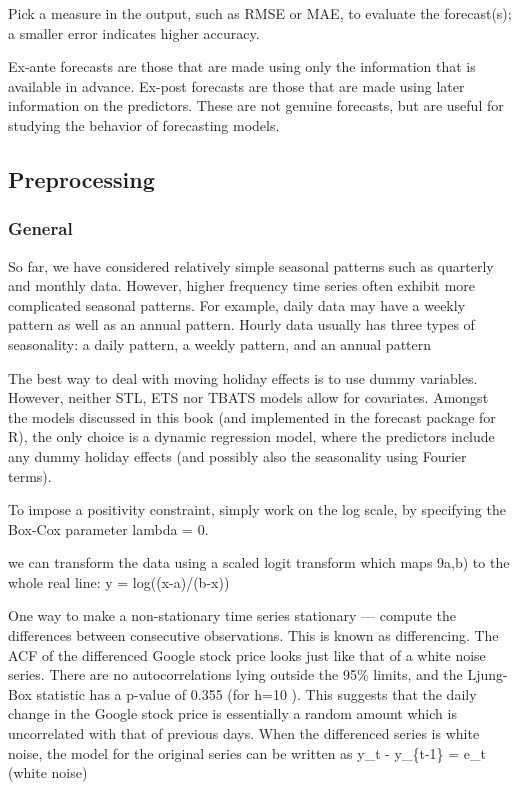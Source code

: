 \documentclass[]{book}
\begin{document}
Pick a measure in the output, such as RMSE or MAE, to evaluate the
forecast(s); a smaller error indicates higher accuracy.

Ex-ante forecasts are those that are made using only the information
that is available in advance. Ex-post forecasts are those that are made
using later information on the predictors. These are not genuine
forecasts, but are useful for studying the behavior of forecasting
models.

\subsection{Preprocessing}\label{preprocessing}

\subsubsection{General}\label{general-7}

So far, we have considered relatively simple seasonal patterns such as
quarterly and monthly data. However, higher frequency time series often
exhibit more complicated seasonal patterns. For example, daily data may
have a weekly pattern as well as an annual pattern. Hourly data usually
has three types of seasonality: a daily pattern, a weekly pattern, and
an annual pattern

The best way to deal with moving holiday effects is to use dummy
variables. However, neither STL, ETS nor TBATS models allow for
covariates. Amongst the models discussed in this book (and implemented
in the forecast package for R), the only choice is a dynamic regression
model, where the predictors include any dummy holiday effects (and
possibly also the seasonality using Fourier terms).

To impose a positivity constraint, simply work on the log scale, by
specifying the Box-Cox parameter lambda = 0.

we can transform the data using a scaled logit transform which maps
9a,b) to the whole real line: y = log((x-a)/(b-x))

One way to make a non-stationary time series stationary --- compute the
differences between consecutive observations. This is known as
differencing. The ACF of the differenced Google stock price looks just
like that of a white noise series. There are no autocorrelations lying
outside the 95\% limits, and the Ljung-Box statistic has a p-value of
0.355 (for h=10 ). This suggests that the daily change in the Google
stock price is essentially a random amount which is uncorrelated with
that of previous days. When the differenced series is white noise, the
model for the original series can be written as y\_t - y\_\{t-1\} = e\_t
(white noise)
\end{document}

